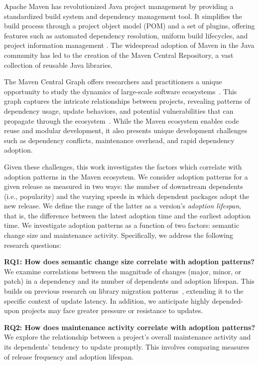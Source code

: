 \documentclass[conference]{IEEEtran}
\begin{document}
Apache Maven has revolutionized Java project management by providing a standardized build system and dependency management tool. It simplifies the build process through a project object model (POM) and a set of plugins, offering features such as automated dependency resolution, uniform build lifecycles, and project information management \cite{yang2023towards}. The widespread adoption of Maven in the Java community has led to the creation of the Maven Central Repository, a vast collection of reusable Java libraries.

The Maven Central Graph offers researchers and practitioners a unique opportunity to study the dynamics of large-scale software ecosystems~\cite{jaime_goblin_2024}. This graph captures the intricate relationships between projects, revealing patterns of dependency usage, update behaviors, and potential vulnerabilities that can propagate through the ecosystem~\cite{wu2023understanding}. While the Maven ecosystem enables code reuse and modular development, it also presents unique development challenges such as dependency conflicts, maintenance overhead, and rapid dependency adoption.

Given these challenges, this work investigates the factors which correlate with adoption patterns in the Maven ecosystem. We consider adoption patterns for a given release as measured in two ways: the number of downstream dependents (i.e., popularity) and the varying speeds in which dependent packages adopt the new release. We define the range of the latter as a version's \textit{adoption lifespan}, that is, the difference between the latest adoption time and the earliest adoption time. We investigate adoption patterns as a function of two factors: semantic change size and maintenance activity. Specifically, we address the following research questions:

\textbf{RQ1: How does semantic change size correlate with adoption patterns?}  We examine correlations between the magnitude of changes (major, minor, or patch) in a dependency and its number of dependents and adoption lifespan. This builds on previous research on library migration patterns~\cite{he2021large}, extending it to the specific context of update latency. In addition, we anticipate highly depended-upon projects may face greater pressure or resistance to updates.

\textbf{RQ2: How does maintenance activity correlate with adoption patterns?}  We explore the relationship between a project's overall maintenance activity and its dependents' tendency to update promptly. This involves comparing measures of release frequency and adoption lifespan. 
\end{document}
